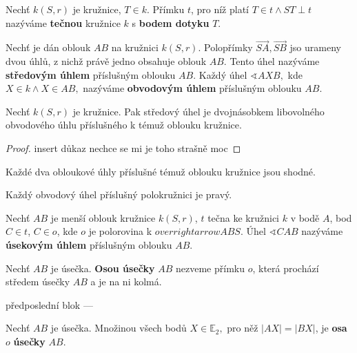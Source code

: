 \begin{definition}
  Nechť $k(S,r)$ je kružnice, $T\in k$. Přímku $t$, pro níž platí $T\in t \land ST \perp t$ nazýváme \textbf{tečnou} kružnice $k$ s \textbf{bodem dotyku} $T$. 
\end{definition}

\begin{definition}
  Nechť je dán oblouk $AB$ na kružnici $k(S,r).$ Polopřímky $\overrightarrow{SA}, \overrightarrow{SB}$ jso urameny dvou úhlů, z nichž právě jedno obsahuje oblouk $AB$. Tento úhel nazýváme \textbf{středovým úhlem} příslušným oblouku $AB$. Každý úhel $\sphericalangle AXB,$ kde $X\in k \land X\in AB,$ nazýváme \textbf{obvodovým úhlem} příslušným oblouku $AB$.
\end{definition}

\begin{veta}
  Nechť $k(S,r)$ je kružnice. Pak středový úhel je dvojnásobkem libovolného obvodového úhlu příslušného k témuž oblouku kružnice.
\end{veta}


\begin{proof}
  insert důkaz nechce se mi je toho strašně moc
\end{proof}


\begin{veta}
  Každé dva obloukové úhly příslušné témuž oblouku kružnice jsou shodné.
\end{veta}


\begin{veta}[Thaletova]
  Každý obvodový úhel příslušný polokružnici je pravý.
\end{veta}

\begin{definition}
  Nechť $AB$ je menší oblouk kružnice $k(S,r)$, $t$ tečna ke kružnici $k$ v bodě $A$, bod $C\in t$, $C\in o$, kde $o$ je polorovina k $overrightarrow{ABS}.$ Úhel $\sphericalangle CAB$ nazýváme \textbf{úsekovým úhlem} příslušným oblouku $AB$.
\end{definition}


\begin{definition}
  Nechť $AB$ je úsečka. \textbf{Osou úsečky} $AB$ nezveme přímku $o$, která prochází středem úsečky $AB$ a je na ni kolmá.
\end{definition}


předposlední blok ---
\begin{veta}\label{mbdv}
  Nechť $AB$ je úsečka. Množinou všech bodů $X\in \mathbb E_2,$ pro něž $|AX|=|BX|$, je \textbf{osa} $o$ \textbf{úsečky} $AB$.
\end{veta}

